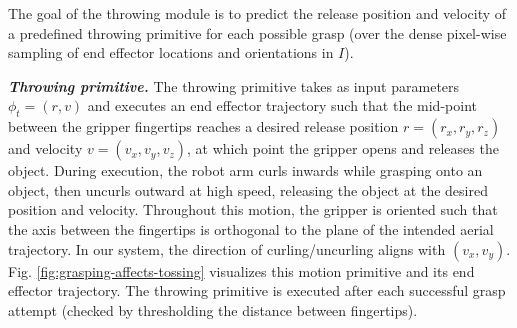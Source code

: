 \documentclass[journal]{IEEEtran}
\newcommand{\ie}{\textit{i}.\textit{e}., }
\newcommand{\mypara}[1]{\par\vspace*{0.8mm}\noindent\textbf{\textit{#1}}}
\newcommand{\andy}{\textcolor{blue}{AZ: }\textcolor{blue}}
\begin{document}


The goal of the throwing module is to predict the release position and velocity of a predefined throwing primitive for each possible grasp (over the dense pixel-wise sampling of end effector locations and orientations in $I$).

\mypara{Throwing primitive.} The throwing primitive takes as input parameters $\phi_{t}=(r,v)$ and executes an end effector trajectory such that the mid-point between the gripper fingertips reaches a desired release position $r=(r_x,r_y,r_z)$ and velocity $v=(v_x,v_y,v_z)$, at which point the gripper opens and releases the object. During execution, the robot arm curls inwards while grasping onto an object, then uncurls outward at high speed, releasing the object at the desired position and velocity. Throughout this motion, the gripper is oriented such that the axis between the fingertips is orthogonal to the plane of the intended aerial trajectory. In our system, the direction of curling/uncurling aligns with $(v_x,v_y)$. Fig. \ref{fig:grasping-affects-tossing} visualizes this motion primitive and its end effector trajectory. The throwing primitive is executed after each successful grasp attempt (checked by thresholding the distance between fingertips).
\end{document}
